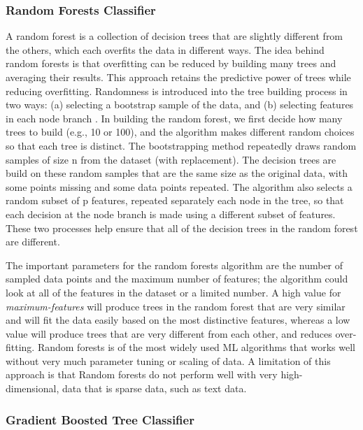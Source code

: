 \documentclass[sigconf]{acmart}
\begin{document}
\subsubsection{Random Forests Classifier}

A random forest is a collection of decision trees that are slightly different 
from the others, which each overfits the data in different ways. The idea 
behind random forests is that overfitting can be reduced by building many 
trees and averaging their results. This approach retains the predictive power 
of trees while reducing overfitting. Randomness is introduced into the tree 
building process in two ways: (a) selecting a bootstrap sample of the data, 
and (b) selecting features in each node branch \cite{muller17,raschka17}. In 
building the random forest, we first decide how many trees to build (e.g., 10 
or 100), and the algorithm makes different random choices so that each tree is 
distinct. The bootstrapping method repeatedly draws random samples of size n 
from the dataset (with replacement). The decision trees are build on these 
random samples that are the same size as the original data, with some points 
missing and some data points repeated. The algorithm also selects a random 
subset of p features, repeated separately each node in the tree, so that 
each decision at the node branch is made using a different subset of features.
These two processes help ensure that all of the decision trees in the random
forest are different. 

The important parameters for the random forests 
algorithm are the number of sampled data points and the maximum number of 
features; the algorithm could look at all of the features in the dataset
or a limited number. A high value for \emph{maximum-features} will produce 
trees in the random forest that are very similar and will fit the data 
easily based on the most distinctive features, whereas a low value will 
produce trees that are very different from each other, and reduces over-
fitting. Random forests is of the most widely used ML algorithms that works 
well without very much parameter tuning or scaling of data. A limitation of 
this approach is that Random forests do not perform well with very high-
dimensional, data that is sparse data, such as text data.

\subsubsection{Gradient Boosted Tree Classifier}
\end{document}
